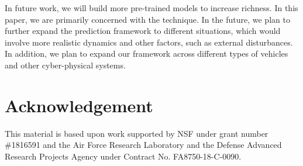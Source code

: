 \documentclass[letterpaper, 10 pt, conference]{ieeeconf}  %
\newcommand\NB[1]{$\spadesuit$\footnote{NB: #1}}
\begin{document}
In future work, we will build more pre-trained models to increase richness. In this paper, we are primarily concerned with the technique. In the future, we plan to further expand the prediction framework to different situations, which would involve more realistic dynamics and other factors, such as external disturbances. In addition, we plan to expand our framework across different types of vehicles and other cyber-physical systems.

\section{Acknowledgement}

This material is based upon work supported by NSF under grant number \#1816591 and 
the Air Force Research Laboratory and the Defense Advanced Research Projects Agency under Contract No. FA8750-18-C-0090. 


%
%
%


  
  

%




\end{document}
